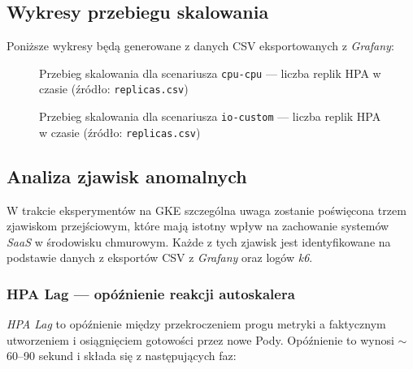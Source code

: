 \subsection{Wykresy przebiegu skalowania}


Poniższe wykresy będą generowane z danych CSV eksportowanych z \textit{Grafany}:

\begin{figure}[H]
  \centering
  \caption{Przebieg skalowania dla scenariusza \texttt{cpu-cpu} — liczba replik HPA w czasie (źródło: \texttt{replicas.csv})}
  \label{fig:scaling-cpu-cpu}
\end{figure}

\begin{figure}[H]
  \centering
  \caption{Przebieg skalowania dla scenariusza \texttt{io-custom} — liczba replik HPA w czasie (źródło: \texttt{replicas.csv})}
  \label{fig:scaling-io-custom}
\end{figure}

\subsection{Analiza zjawisk anomalnych}

W trakcie eksperymentów na GKE szczególna uwaga zostanie poświęcona trzem zjawiskom przejściowym, które mają istotny wpływ na zachowanie systemów \textit{SaaS} w środowisku chmurowym. Każde z tych zjawisk jest identyfikowane na podstawie danych z eksportów CSV z \textit{Grafany} oraz logów \textit{k6}.

\subsubsection{HPA Lag — opóźnienie reakcji autoskalera}

\textit{HPA Lag} to opóźnienie między przekroczeniem progu metryki a faktycznym utworzeniem i osiągnięciem gotowości przez nowe Pody. Opóźnienie to wynosi $\sim$60--90 sekund i składa się z następujących faz:

